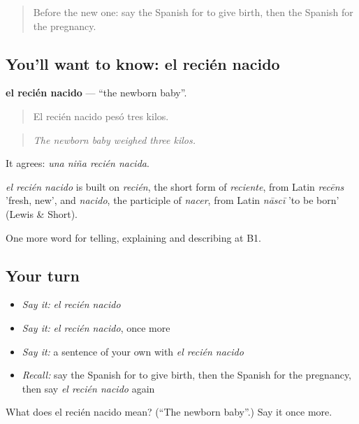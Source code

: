 \label{lesson:ES-C544-recien-nacido}



\begin{quote}
Before the new one: say the Spanish for to give birth, then the Spanish for the pregnancy.
\end{quote}

\subsection*{You'll want to know: el recién nacido}
\textbf{el recién nacido} — \textquotedblleft{}the newborn baby\textquotedblright{}.

\begin{quote}
El recién nacido pesó tres kilos.
\end{quote}

\begin{quote}
\emph{The newborn baby weighed three kilos.}
\end{quote}

It agrees: \emph{una niña recién nacida}.

\begin{cousinweb}
\emph{el recién nacido} is built on \emph{recién}, the short form of \emph{reciente}, from Latin \emph{recēns} 'fresh, new', and \emph{nacido}, the participle of \emph{nacer}, from Latin \emph{nāscī} 'to be born' (Lewis \& Short).
\end{cousinweb}

\begin{grammarlens}[title={What you've built}]
One more word for telling, explaining and describing at B1.
\end{grammarlens}

\subsection*{Your turn}
\begin{itemize}
\raggedright
  \item \emph{Say it:} \emph{el recién nacido}
  \item \emph{Say it:} \emph{el recién nacido}, once more
  \item \emph{Say it:} a sentence of your own with \emph{el recién nacido}
  \item \emph{Recall:} say the Spanish for to give birth, then the Spanish for the pregnancy, then say \emph{el recién nacido} again
\end{itemize}

\begin{tcolorbox}[breakable,colback=teal!4,colframe=teal!35!black,title={Before you move on}]
What does el recién nacido mean? (\textquotedblleft{}The newborn baby\textquotedblright{}.) Say it once more.
\end{tcolorbox}
